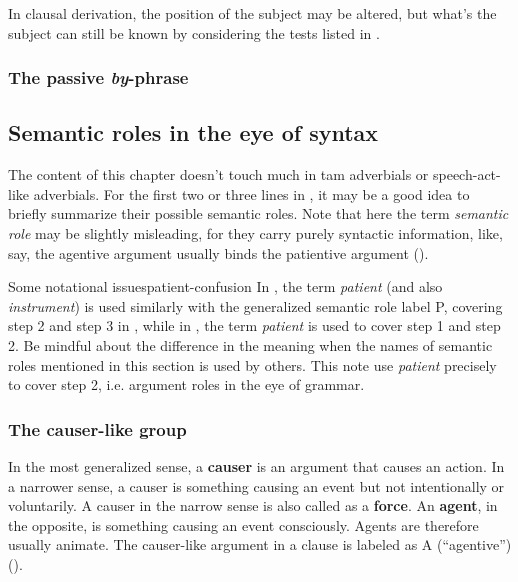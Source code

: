 \documentclass[UTF8, a4paper, oneside, scheme=plain]{ctexrep}
\newcommand*{\citesec}[1]{\S~{#1}}
\newcommand*{\citechap}[1]{Ch~{#1}}
\newcommand*{\citepage}[1]{p.~{#1}}
\newcommand*{\concept}[1]{\textbf{#1}}
\newcommand*{\term}[1]{\emph{#1}}
\newcommand{\corpus}[1]{\emph{#1}}
\begin{document}
In clausal derivation, the position of the subject may be altered,
but what's the subject can still be known by considering the tests listed in 
\citet[\citechap{4}, \citesec{3.2.3}]{cgel}.

\subsubsection{The passive \corpus{by}-phrase}\label{sec:valency.overview.by-phrase}

\subsection{Semantic roles in the eye of syntax}\label{sec:valency.overview.semantic-roles}

The content of this chapter doesn't touch much in \acs{tam} adverbials or speech-act-like adverbials.
For the first two or three lines in ,
it may be a good idea to briefly summarize their possible semantic roles.
Note that here the term \term{semantic role} may be slightly misleading,
for they carry purely syntactic information, 
like, say, the agentive argument usually binds the patientive argument 
().

\begin{infobox}{Some notational issues}{patient-confusion}
    In \citet[\citepage{111}]{dixon2005semantic}, 
    the term \term{patient} (and also \term{instrument}) 
    is used similarly with the generalized semantic role label P,
    covering step 2 and step 3 in ,
    while in \citet[\citepage{50}]{payne1997describing},
    the term \term{patient} is used to cover step 1 and step 2.
    Be mindful about the difference in the meaning 
    when the names of semantic roles mentioned in this section is used by others.
    This note use \term{patient} precisely to cover step 2, 
    i.e. argument roles in the eye of grammar.
\end{infobox}

\subsubsection{The causer-like group}

In the most generalized sense,
a \concept{causer} is an argument that causes an action. 
In a narrower sense, a causer is something causing an event but not intentionally or voluntarily.
A causer in the narrow sense is also called as a \concept{force}.
An \concept{agent}, in the opposite, is something causing an event consciously.
Agents are therefore usually animate.
The causer-like argument in a clause is labeled as A (``agentive'')
().
\end{document}
